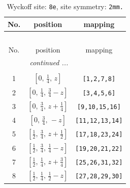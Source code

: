 \documentclass[fleqn,8pt]{jsarticle}
\begin{document}
\begin{longtable}{ccc}
\caption{Wyckoff site: {\tt 8e}, site symmetry: {\tt 2mm.}}
 \\
 \hline \hline
No. & position & mapping \\ \hline \endfirsthead

\multicolumn{2}{l}{\tablename\ \thetable{}} \\
 \hline \hline
No. & position & mapping \\ \hline \endhead

 \hline \hline
\multicolumn{2}{r}{\footnotesize\it continued ...} \\ \endfoot

 \hline \hline
\multicolumn{2}{r}{} \\ \endlastfoot

1 & $\left[ 0,\, \frac{1}{4},\, z \right]$ & {\tt [1,2,7,8]} \\ \hline
2 & $\left[ 0,\, \frac{1}{4},\, \frac{3}{4} - z \right]$ & {\tt [3,4,5,6]} \\ \hline
3 & $\left[ 0,\, \frac{3}{4},\, z + \frac{1}{4} \right]$ & {\tt [9,10,15,16]} \\ \hline
4 & $\left[ 0,\, \frac{3}{4},\, - z \right]$ & {\tt [11,12,13,14]} \\ \hline
5 & $\left[ \frac{1}{2},\, \frac{3}{4},\, z + \frac{1}{2} \right]$ & {\tt [17,18,23,24]} \\ \hline
6 & $\left[ \frac{1}{2},\, \frac{3}{4},\, \frac{1}{4} - z \right]$ & {\tt [19,20,21,22]} \\ \hline
7 & $\left[ \frac{1}{2},\, \frac{1}{4},\, z + \frac{3}{4} \right]$ & {\tt [25,26,31,32]} \\ \hline
8 & $\left[ \frac{1}{2},\, \frac{1}{4},\, \frac{1}{2} - z \right]$ & {\tt [27,28,29,30]} \\
\end{longtable}
\renewcommand{\arraystretch}{1.2}
\end{document}
